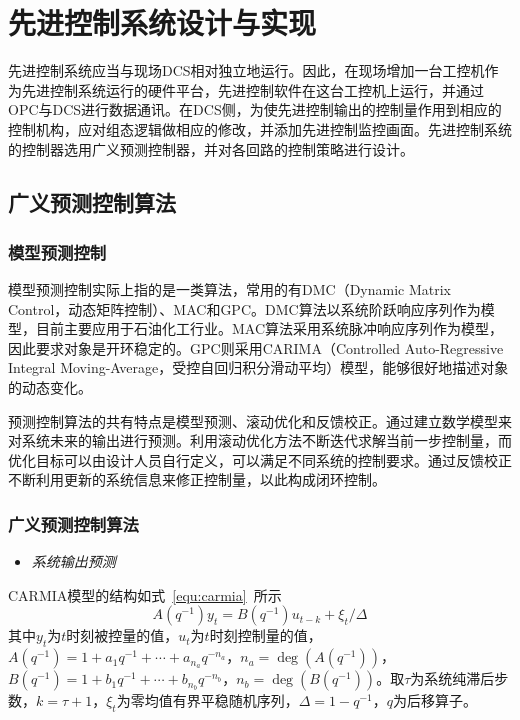 \chapter{先进控制系统设计与实现}
\label{chap:design}
先进控制系统应当与现场DCS相对独立地运行。因此，在现场增加一台工控机作为先进控制系统运行的硬件平台，先进控制软件在这台工控机上运行，并通过OPC与DCS进行数据通讯。在DCS侧，为使先进控制输出的控制量作用到相应的控制机构，应对组态逻辑做相应的修改，并添加先进控制监控画面。先进控制系统的控制器选用广义预测控制器，并对各回路的控制策略进行设计。



\section{广义预测控制算法}
\subsection{模型预测控制}
模型预测控制实际上指的是一类算法，常用的有DMC（Dynamic Matrix Control，动态矩阵控制）、MAC和GPC。DMC算法以系统阶跃响应序列作为模型，目前主要应用于石油化工行业\cite{cutler1980dynamic}。MAC算法采用系统脉冲响应序列作为模型，因此要求对象是开环稳定的\cite{richalet1978model}。GPC则采用CARIMA（Controlled Auto-Regressive Integral Moving-Average，受控自回归积分滑动平均）模型，能够很好地描述对象的动态变化\cite{clarke1987generalized}。

预测控制算法的共有特点是模型预测、滚动优化和反馈校正。通过建立数学模型来对系统未来的输出进行预测。利用滚动优化方法不断迭代求解当前一步控制量，而优化目标可以由设计人员自行定义，可以满足不同系统的控制要求。通过反馈校正不断利用更新的系统信息来修正控制量，以此构成闭环控制。
\subsection{广义预测控制算法}

\begin{itemize}
\item{\emph{系统输出预测}}
\end{itemize}

CARMIA模型的结构如式~\ref{equ:carmia}~所示
\begin{equation}
\label{equ:carmia}
        A(q^{-1}) y_{t}=B(q^{-1}) u_{t-k}+{\xi_{t}}/{\Delta}
\end{equation}
其中$y_{t}$为$t$时刻被控量的值，$u_{t}$为$t$时刻控制量的值，$A(q^{-1})=1+a_1q^{-1}+\cdots+a_{n_a}q^{-n_a}$，$n_a = \deg (A(q^{-1}))$，$B(q^{-1})=1+b_1q^{-1}+\cdots+b_{n_b}q^{-n_b}$，$n_b = \deg (B(q^{-1}))$。取$\tau$为系统纯滞后步数，$k=\tau+1$，${\xi_t}$为零均值有界平稳随机序列，$\Delta = 1- q^{-1}$，$q$为后移算子。

